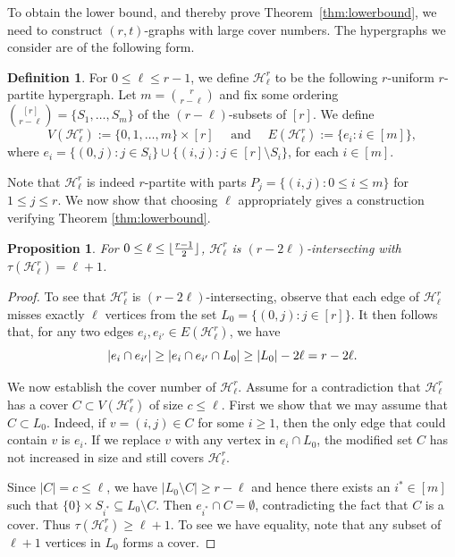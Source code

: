 \documentclass[a4paper,twoside,11pt]{article}
\DeclarePairedDelimiter{\floor}{\lfloor}{\rfloor}
\DeclarePairedDelimiter{\card}{|}{|}
\newtheorem{prop}[thm]{Proposition}
\numberwithin{thm}{section}
\theoremstyle{definition}
\newtheorem{dfn}[thm]{Definition}
\theoremstyle{remark}
\theoremstyle{definition}
\def\cH{{\mathcal H}}
\newcommand{\m}[1]{\mathcal{#1}}
\begin{document}
To obtain the lower bound, and thereby prove Theorem~\ref{thm:lowerbound}, we need to construct $(r,t)$-graphs with large cover numbers. The hypergraphs we consider are of the following form.

\begin{dfn} \label{def:1levelconstruction}
For $0\leq\ell \leq r-1$, we define $\cH^r_\ell$ to be the following $r$-uniform $r$-partite  hypergraph. Let $m=\binom{r}{r-\ell}$ and fix some ordering $\binom{[r]}{r-\ell}=\{S_1,\ldots,S_m\}$ of the $(r-\ell)$-subsets of $[r]$. We define  
\[V(\cH^r_\ell):= \{0,1,\ldots,m\} \times [r] \quad \mbox{ and } \quad E(\cH^r_\ell):=\{e_i: i \in[m]\},\]
where $e_i=\{(0,j):j\in S_i\}\cup \{(i,j):j\in [r]\setminus S_i\}$, for each $i\in[m]$.
\end{dfn}

Note that $\cH^r_\ell$ is indeed  $r$-partite with  parts $P_j=\{(i,j):0\leq i \leq m \}$ for $1\leq j\leq r$. We now show that choosing $\ell$ appropriately gives a construction verifying Theorem \ref{thm:lowerbound}. 

\begin{prop} \label{prop:lowerboundcalcs} 
For $0 \le \ell \le \floor{\frac{r-1}{2}}$, $\m H^r_{\ell}$ is $(r - 2 \ell)$-intersecting with $\tau(\m H^r_{\ell}) = \ell + 1$.
\end{prop}
\begin{proof}
To see that $\m H^r_{\ell}$ is $(r-2\ell)$-intersecting, observe that each edge of $\m H^r_{\ell}$ misses exactly $\ell$ vertices from the set $L_0 = \{(0,j) : j \in [r]\}$. It then follows that, for any two edges $e_i, e_{i'} \in E(\m H^r_{\ell})$, we have
\[ \card{e_i\cap e_{i'}} \geq \card{e_i\cap e_{i'}\cap L_0} \geq \card{L_0} - 2\ell = r-2\ell. \]

We now establish the cover number of $\cH_\ell^r$. Assume for a contradiction that $\cH^r_\ell$ has a cover $C\subset V(\cH^r_\ell)$ of size $c\leq \ell$. First we show that we may assume that $C\subset L_0$. Indeed, if $v = (i,j) \in C$ for some $i \ge 1$, then the only edge that could contain $v$ is $e_i$.  If we replace $v$ with any  vertex in $e_i\cap L_0$, the modified set $C$ has not increased in size and still covers $\m H^r_\ell$.

Since $|C|=c\leq \ell$, we have $|L_0\setminus C|\geq r-\ell$ and hence there exists an $i^*\in[m]$ such that $\{0\}\times S_{i^*}\subseteq L_0\setminus C$. Then $e_{i^*}\cap C=\emptyset$, contradicting the fact that $C$ is a cover. Thus $\tau(\cH^r_\ell)\geq \ell+1$. To see we have equality, note that any subset of $\ell+1$ vertices in $L_0$ forms a cover. 
\end{proof}
\end{document}
